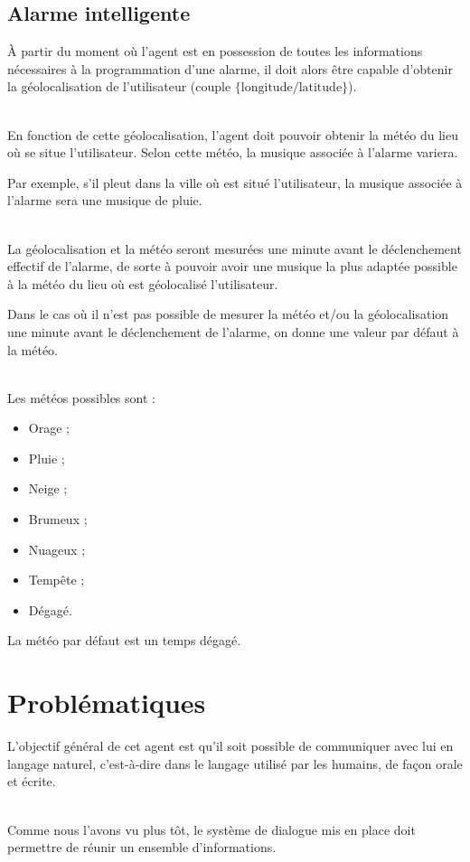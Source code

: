 \subsection{Alarme intelligente}
\`A partir du moment où l'agent est en possession de toutes les informations nécessaires à la programmation d'une alarme, il doit alors être capable d'obtenir la géolocalisation de l'utilisateur (couple $\{\text{longitude} / \text{latitude} \}$). 

~\\\indent 
En fonction de cette géolocalisation, l'agent doit pouvoir obtenir la météo du lieu où se situe l'utilisateur. Selon cette météo, la musique associée à l'alarme variera. 

Par exemple, s'il pleut dans la ville où est situé l'utilisateur, la musique associée à l'alarme sera une musique de pluie.

~\\\indent
La géolocalisation et la météo seront mesurées une minute avant le déclenchement effectif de l'alarme, de sorte à pouvoir avoir une musique la plus adaptée possible à la météo du lieu où est géolocalisé l'utilisateur.

Dans le cas où il n'est pas possible de mesurer la météo et/ou la géolocalisation une minute avant le déclenchement de l'alarme, on donne une valeur par défaut à la météo.

~\\\indent
Les météos possibles sont : 
\begin{itemize}
    \item Orage ;
    \item Pluie ;
    \item Neige ;
    \item Brumeux ;
    \item Nuageux ;
    \item Tempête ;
    \item Dégagé.
\end{itemize}

\noindent La météo par défaut est un temps dégagé.


\section{Problématiques}
L'objectif général de cet agent est qu'il soit possible de communiquer avec lui en langage naturel, c'est-à-dire dans le langage utilisé par les humains, de façon orale et écrite. 

~\\\indent
Comme nous l'avons vu plus tôt, le système de dialogue mis en place doit permettre de réunir un ensemble d'informations.

